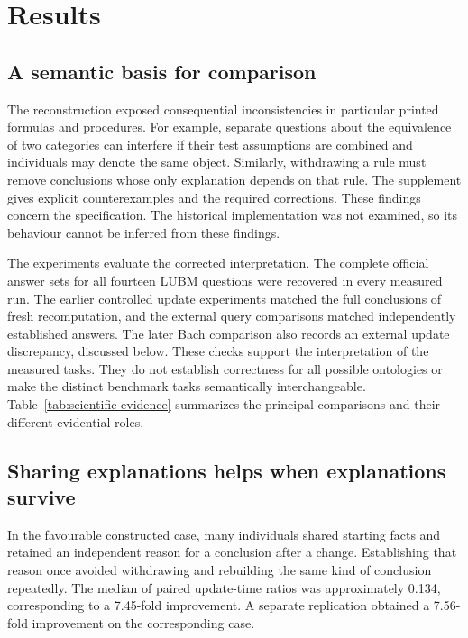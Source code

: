 \documentclass{article}
\begin{document}



\section{Results}
\label{sec:results}
\subsection{A semantic basis for comparison}
The reconstruction exposed consequential inconsistencies in particular printed
formulas and procedures. For example, separate questions about the equivalence
of two categories can interfere if their test assumptions are combined and
individuals may denote the same object. Similarly, withdrawing a rule must
remove conclusions whose only explanation depends on that rule. The
supplement gives explicit counterexamples and the required corrections.
These findings concern the specification. The historical implementation was
not examined, so its behaviour cannot be inferred from these findings.

The experiments evaluate the corrected interpretation. The complete official
answer sets for all fourteen LUBM questions were recovered in every measured
run. The earlier controlled update experiments matched the full conclusions
of fresh recomputation, and the external query comparisons matched independently
established answers. The later Bach comparison also records an external
update discrepancy, discussed below.
These checks support the interpretation of the measured tasks. They do not
establish correctness for all possible ontologies or make the distinct
benchmark tasks semantically interchangeable.
Table~\ref{tab:scientific-evidence} summarizes the principal comparisons and
their different evidential roles.

\subsection{Sharing explanations helps when explanations survive}
In the favourable constructed case, many individuals shared starting facts
and retained an independent reason for a conclusion after a change. Establishing
that reason once avoided withdrawing and rebuilding the same kind of
conclusion repeatedly. The median of paired update-time ratios was approximately
0.134, corresponding to a 7.45-fold improvement. A separate replication
obtained a 7.56-fold improvement on the corresponding case.
\end{document}
